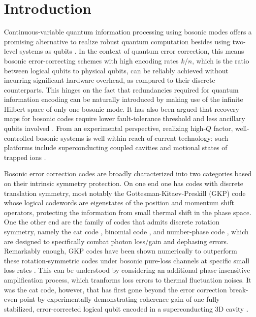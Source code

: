 \documentclass[%
 reprint,
superscriptaddress,
 amsmath,amssymb,
 aps,13pt
]{revtex4-2}
\begin{document}
\maketitle

\section{Introduction}
Continuous-variable quantum information processing using bosonic modes offers a promising alternative to realize robust quantum computation besides using two-level systems as qubits \cite{Joshi_2021, PhysRevA.56.1114}. In the context of quantum error correction, this means bosonic error-correcting schemes with high encoding rates $k/n$, which is the ratio between logical qubits to physical qubits, can be reliably achieved without incurring significant hardware overhead, as compared to their discrete counterparts. This hinges on the fact that redundancies required for quantum information encoding can be naturally introduced by making use of the infinite Hilbert space of only one bosonic mode. It has also been argued that recovery maps for bosonic codes require lower fault-tolerance threshold and less ancillary qubits involved \cite{gkp, gkp_perspective}. From an experimental perspective, realizing high-$Q$ factor, well-controlled bosonic systems is well within reach of current technology; such platforms include superconducting coupled cavities \cite{PhysRevX.13.021004} and motional states of trapped ions \cite{PhysRevLett.124.170502}.

Bosonic error correction codes are broadly characterized into two categories based on their intrinsic symmetry protection. On one end one has codes with discrete translation symmetry, most notably the Gottesman-Kitaev-Preskill (GKP) \cite{gkp} code whose logical codewords are eigenstates of the position and momentum shift operators, protecting the information from small thermal shift in the phase space. One the other end are the family of codes that admits discrete rotation symmetry, namely the cat code \cite{Mirrahimi_2014}, binomial code \cite{bin}, and number-phase code \cite{rotation_symmetric}, which are designed to specifically combat photon loss/gain and dephasing errors. Remarkably enough, GKP codes have been shown numerically to outperform these rotation-symmetric codes under bosonic pure-loss channels at specific small loss rates \cite{performance_structure}. This can be understood by considering an additional phase-insensitive amplification process, which tranforms loss errors to thermal fluctuation noises. It was the cat code, however, that has first gone beyond the error correction break-even point by experimentally demonstrating coherence gain of one fully stabilized, error-corrected logical qubit encoded in a superconducting 3D cavity \cite{devoret, ofek16}.
\end{document}
